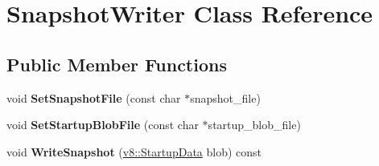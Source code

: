 \hypertarget{class_snapshot_writer}{}\section{Snapshot\+Writer Class Reference}
\label{class_snapshot_writer}
\subsection*{Public Member Functions}
\begin{DoxyCompactItemize}
\item 
void {\bfseries Set\+Snapshot\+File} (const char $\ast$snapshot\+\_\+file)\hypertarget{class_snapshot_writer_a9dfe3e72069e8bffc41b4803c92feb91}{}\label{class_snapshot_writer_a9dfe3e72069e8bffc41b4803c92feb91}

\item 
void {\bfseries Set\+Startup\+Blob\+File} (const char $\ast$startup\+\_\+blob\+\_\+file)\hypertarget{class_snapshot_writer_a90fab85303850b6830bfe074e991ca2e}{}\label{class_snapshot_writer_a90fab85303850b6830bfe074e991ca2e}

\item 
void {\bfseries Write\+Snapshot} (\hyperlink{classv8_1_1_startup_data}{v8\+::\+Startup\+Data} blob) const \hypertarget{class_snapshot_writer_a0aff8fed7debcbb98a7030a2552e351d}{}\label{class_snapshot_writer_a0aff8fed7debcbb98a7030a2552e351d}

\end{DoxyCompactItemize}
